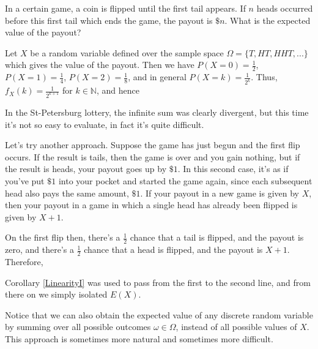 \begin{examp}
In a certain game, a coin is flipped until the first tail appears. If $n$ heads occurred before this first tail which ends the game, the payout is $\$n$. What is the expected value of the payout?
\par
\noindent Let $X$ be a random variable defined over the sample space $\Omega = \{T, HT, HHT, ...\}$ which gives the value of the payout. Then we have $P(X = 0) = \frac{1}{2}$, $P(X = 1) = \frac{1}{4}$, $P(X = 2) = \frac{1}{8}$, and in general $P(X = k) = \frac{1}{2^k}$. Thus, $f_X(k) = \frac{1}{2^{k+1}}$ for $k \in \mathbb{N}$, and hence
\par
\noindent In the St-Petersburg lottery, the infinite sum was clearly divergent, but this time it's not so easy to evaluate, in fact it's quite difficult.
\par
\noindent Let's try another approach. Suppose the game has just begun and the first flip occurs. If the result is tails, then the game is over and you gain nothing, but if the result is heads, your payout goes up by $\$1$. In this second case, it's as if you've put $\$1$ into your pocket and started the game again, since each subsequent head also pays the same amount, $\$1$. If your payout in a new game is given by $X$, then your payout in a game in which a single head has already been flipped is given by $X+1$.
\par
\noindent On the first flip then, there's a $\frac{1}{2}$ chance that a tail is flipped, and the payout is zero, and there's a $\frac{1}{2}$ chance that a head is flipped, and the payout is $X+1$. Therefore,
\par
\noindent Corollary \ref{LinearityI} was used to pass from the first to the second line, and from there on we simply isolated $E(X)$.
\end{examp}
\par
Notice that we can also obtain the expected value of any discrete random variable by summing over all possible outcomes $\omega \in \Omega$, instead of all possible values of $X$. This approach is sometimes more natural and sometimes more difficult.
